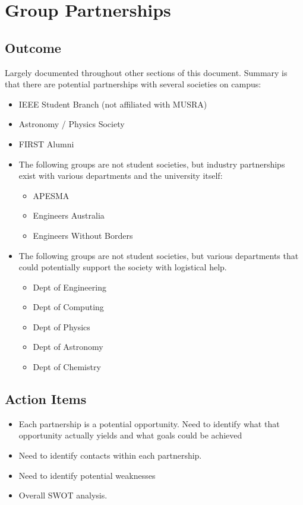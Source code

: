 \section{Group Partnerships}
\label{sec:GroupPartnerships}
\subsection{Outcome}
Largely documented throughout other sections of this document. Summary is that
there are potential partnerships with several societies on campus:
\begin{itemize}
  \item IEEE Student Branch (not affiliated with MUSRA)
  \item Astronomy / Physics Society
  \item FIRST Alumni
  \item The following groups are not student societies, but industry
  partnerships exist with various departments and the university itself:
  \begin{itemize}
    \item APESMA
    \item Engineers Australia
    \item Engineers Without Borders
  \end{itemize}
  \item The following groups are not student societies, but various departments
  that could potentially support the society with logistical help.
  \begin{itemize}
    \item Dept of Engineering
    \item Dept of Computing
    \item Dept of Physics
    \item Dept of Astronomy
    \item Dept of Chemistry
  \end{itemize}
\end{itemize}

\subsection{Action Items}
\begin{itemize}
  \item Each partnership is a potential opportunity. Need to identify what that
  opportunity actually yields and what goals could be achieved
  \item Need to identify contacts within each partnership.
  \item Need to identify potential weaknesses
  \item Overall SWOT analysis.
\end{itemize}